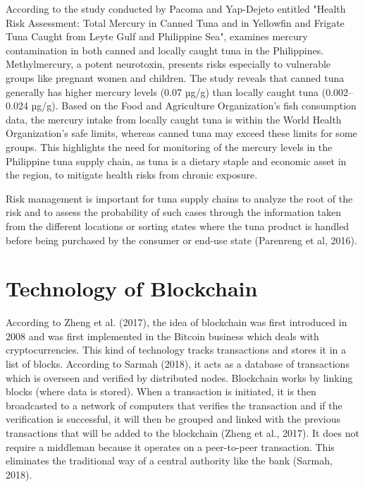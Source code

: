 According to the study conducted by Pacoma and Yap-Dejeto entitled "Health Risk Assessment: Total Mercury in Canned Tuna and in Yellowfin and Frigate Tuna Caught from Leyte Gulf and Philippine Sea", examines mercury contamination in both canned and locally caught tuna in the Philippines. Methylmercury, a potent neurotoxin, presents risks especially to vulnerable groups like pregnant women and children. The study reveals that canned tuna generally has higher mercury levels (0.07 µg/g) than locally caught tuna (0.002–0.024 µg/g). Based on the Food and Agriculture Organization’s fish consumption data, the mercury intake from locally caught tuna is within the World Health Organization’s safe limits, whereas canned tuna may exceed these limits for some groups. This highlights the need for monitoring of the mercury levels in the Philippine tuna supply chain, as tuna is a dietary staple and economic asset in the region, to mitigate health risks from chronic exposure.

Risk management is important for tuna supply chains to analyze the root of the risk and to assess the probability of such cases through the information taken from the different locations or sorting states where the tuna product is handled before being purchased by the consumer or end-use state (Parenreng et al, 2016).

\section{Technology of Blockchain}

According to Zheng et al. (2017), the idea of blockchain was first introduced in 2008 and was first implemented in the Bitcoin business which deals with cryptocurrencies. This kind of technology tracks transactions and stores it in a list of blocks. According to Sarmah (2018), it acts as a database of transactions which is overseen and verified by distributed nodes. Blockchain works by linking blocks (where data is stored). When a transaction is initiated, it is then broadcasted to a network of computers that verifies the transaction and if the verification is successful, it will then be grouped and linked with the previous transactions that will be added to the blockchain (Zheng et al., 2017). It does not require a middleman because it operates on a peer-to-peer transaction. This eliminates the traditional way of a central authority like the bank (Sarmah, 2018). 

